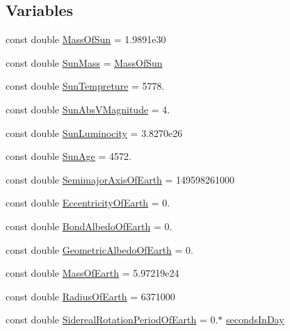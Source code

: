 \subsection*{Variables}
\begin{DoxyCompactItemize}
\item 
const double \mbox{\hyperlink{namespace_e_g_x_phys_a6e84ae13f1dbcecb215af787bbc12cd6}{Mass\+Of\+Sun}} = 1.\+9891e30
\item 
const double \mbox{\hyperlink{namespace_e_g_x_phys_a15b2187a46d73ac35fa7467b8fa6cb19}{Sun\+Mass}} = \mbox{\hyperlink{namespace_e_g_x_phys_a6e84ae13f1dbcecb215af787bbc12cd6}{Mass\+Of\+Sun}}
\item 
const double \mbox{\hyperlink{namespace_e_g_x_phys_a97be71e7f8ca4f7813362bc1dca66db5}{Sun\+Tempreture}} = 5778.
\item 
const double \mbox{\hyperlink{namespace_e_g_x_phys_a61266dc1aaacdd9a9bd0f2fa92aa21c9}{Sun\+Abs\+V\+Magnitude}} = 4.
\item 
const double \mbox{\hyperlink{namespace_e_g_x_phys_a3987543f6972eb72eb2c07d39520b43e}{Sun\+Luminocity}} = 3.\+8270e26
\item 
const double \mbox{\hyperlink{namespace_e_g_x_phys_a173216c099d7915fb16e6416902fcbb8}{Sun\+Age}} = 4572.
\item 
const double \mbox{\hyperlink{namespace_e_g_x_phys_ad1bdca5cec4a0f4a4b8a18ead61de6d9}{Semimajor\+Axis\+Of\+Earth}} = 149598261000
\item 
const double \mbox{\hyperlink{namespace_e_g_x_phys_a327bbaf59d546f8524d6fb9da919d939}{Eccentricity\+Of\+Earth}} = 0.
\item 
const double \mbox{\hyperlink{namespace_e_g_x_phys_a932fff28fce4321fdbf9abc5c1783dc9}{Bond\+Albedo\+Of\+Earth}} = 0.
\item 
const double \mbox{\hyperlink{namespace_e_g_x_phys_aae01fb8ed365fc5de7acebeef34b7351}{Geometric\+Albedo\+Of\+Earth}} = 0.
\item 
const double \mbox{\hyperlink{namespace_e_g_x_phys_ace4a9d8c0b21215536857f4c1087a4e8}{Mass\+Of\+Earth}} = 5.\+97219e24
\item 
const double \mbox{\hyperlink{namespace_e_g_x_phys_a11a2d4a914eb43c4095e225358293a45}{Radius\+Of\+Earth}} = 6371000
\item 
const double \mbox{\hyperlink{namespace_e_g_x_phys_a34a388ac3f9196bb3cdbdbee5ff3cdb7}{Sidereal\+Rotation\+Period\+Of\+Earth}} = 0.$\ast$ \mbox{\hyperlink{namespace_e_g_x_phys_ab4f86327f64403b843077ecc189ce52b}{seconds\+In\+Day}}

\end{DoxyCompactItemize}
